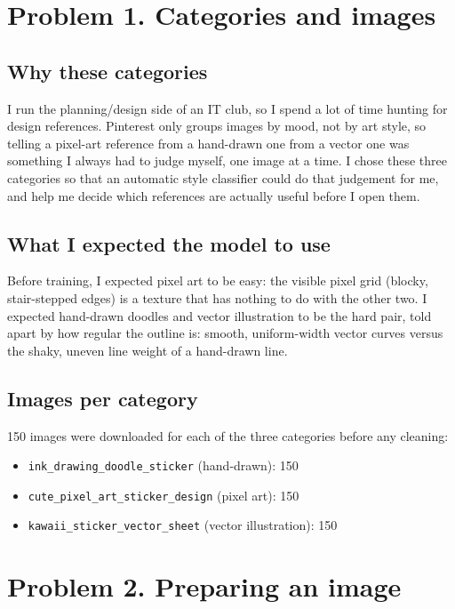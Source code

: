 \documentclass[11pt]{article}
\begin{document}
\makeheader

\section*{Problem 1. Categories and images}

\subsection*{Why these categories}
I run the planning/design side of an IT club, so I spend a lot of time
hunting for design references. Pinterest only groups images by mood, not by
art style, so telling a pixel-art reference from a hand-drawn one from a
vector one was something I always had to judge myself, one image at a time.
I chose these three categories so that an automatic style classifier could do
that judgement for me, and help me decide which references are actually
useful before I open them.

\subsection*{What I expected the model to use}
Before training, I expected pixel art to be easy: the visible pixel grid
(blocky, stair-stepped edges) is a texture that has nothing to do with the
other two. I expected hand-drawn doodles and vector illustration to be the
hard pair, told apart by how regular the outline is: smooth, uniform-width
vector curves versus the shaky, uneven line weight of a hand-drawn line.

\subsection*{Images per category}
150 images were downloaded for each of the three categories before any
cleaning:
\begin{itemize}
  \item \texttt{ink\_drawing\_doodle\_sticker} (hand-drawn): 150
  \item \texttt{cute\_pixel\_art\_sticker\_design} (pixel art): 150
  \item \texttt{kawaii\_sticker\_vector\_sheet} (vector illustration): 150
\end{itemize}

\section*{Problem 2. Preparing an image}
\end{document}

